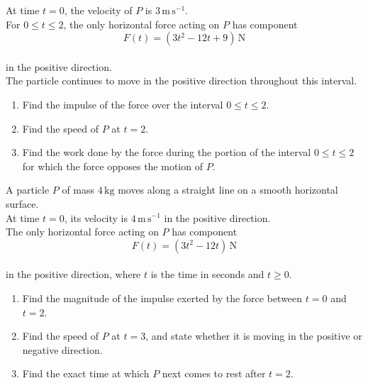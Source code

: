 \documentclass[leqno]{article}
\begin{document}
\begin{enumerate}[
  label=\textbf{\arabic*.},
  leftmargin=*,
  topsep=0pt,
  partopsep=0pt,
  parsep=0pt
]
At time $t=0$, the velocity of $P$ is $3\,\mathrm{m\,s^{-1}}$. \\
For $0\leq t\leq 2$, the only horizontal force acting on $P$ has component
\[
F(t)=(3t^2-12t+9)\,\mathrm{N}
\] \\
in the positive direction. \\
The particle continues to move in the positive direction throughout this interval. \\
\begin{enumerate}[label=\textbf{(\alph*)}]
\item Find the impulse of the force over the interval $0\leq t\leq 2$.  \\
\item Find the speed of $P$ at $t=2$.  \\
\item Find the work done by the force during the portion of the interval $0\leq t\leq 2$ for which the force opposes the motion of $P$.  \\
\end{enumerate}

\newpage

\questionitem

A particle $P$ of mass $4\,\mathrm{kg}$ moves along a straight line on a smooth horizontal surface. \\
At time $t=0$, its velocity is $4\,\mathrm{m\,s^{-1}}$ in the positive direction. \\
The only horizontal force acting on $P$ has component
\[
F(t)=(3t^2-12t)\,\mathrm{N}
\] \\
in the positive direction, where $t$ is the time in seconds and $t\geq 0$. \\
\begin{enumerate}[label=\textbf{(\alph*)}]
\item Find the magnitude of the impulse exerted by the force between $t=0$ and $t=2$.  \\
\item Find the speed of $P$ at $t=3$, and state whether it is moving in the positive or negative direction.  \\
\item Find the exact time at which $P$ next comes to rest after $t=2$.  \\
\end{enumerate}

\newpage


\end{enumerate}
\end{document}
